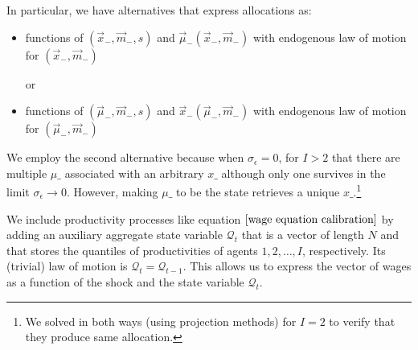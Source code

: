 \documentclass[thmsb,11pt]{article}
\begin{document}
In particular, we have alternatives that express allocations as:
	\begin{itemize}
		\item  functions of $(\vec x_-,\vec m_-,s)$ and $\vec\mu_-(\vec x_-,\vec m_-)$ with endogenous law of motion for $(\vec x_-,\vec m_-)$

		or
		
		\item  functions of $(\vec \mu_-,\vec m_-,s)$ and $\vec x_-(\vec \mu_-,\vec m_-)$ with endogenous law of motion for $(\vec \mu_-,\vec m_-)$
	\end{itemize}
We employ the second alternative because when  $\sigma_{\epsilon}=0$, for $I>2$ that there are multiple $\mu\_$ associated with an arbitrary $x\_$ although only one survives in the limit $\sigma_{\epsilon}\to 0$.  However, making $\mu\_$  to be the state retrieves a unique $x\_$.\footnote{We solved in both ways (using projection methods) for $I = 2$ to verify that they produce same allocation.}

 We include productivity processes like equation $\eqref{wage equation calibration}$  by adding an auxiliary aggregate state variable $\mathcal{Q}_t$ that is a vector of length $N$ and that stores the quantiles of productivities of agents $1,2,\ldots,I$, respectively. Its (trivial) law of motion is $\mathcal{Q}_t=\mathcal{Q}_{t-1}$. This allows us to express the vector of wages as a function of the shock and the state variable $\mathcal{Q}_t$.








\newpage
\end{document}

